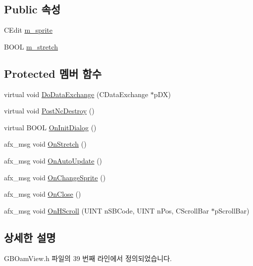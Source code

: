 \subsection*{Public 속성}
\begin{DoxyCompactItemize}
\item 
C\+Edit \mbox{\hyperlink{class_g_b_oam_view_a696d053b141cce3bf87fc4b85732159b}{m\+\_\+sprite}}
\item 
B\+O\+OL \mbox{\hyperlink{class_g_b_oam_view_a3148ea0439a7fc0679298adbdb5d2a3e}{m\+\_\+stretch}}
\end{DoxyCompactItemize}
\subsection*{Protected 멤버 함수}
\begin{DoxyCompactItemize}
\item 
virtual void \mbox{\hyperlink{class_g_b_oam_view_ab5683ad7b53ee6ac8208155503164506}{Do\+Data\+Exchange}} (C\+Data\+Exchange $\ast$p\+DX)
\item 
virtual void \mbox{\hyperlink{class_g_b_oam_view_ac9b79cd9099423b88668870db35a739a}{Post\+Nc\+Destroy}} ()
\item 
virtual B\+O\+OL \mbox{\hyperlink{class_g_b_oam_view_a633fdb700275a8a8ce96978472c643b5}{On\+Init\+Dialog}} ()
\item 
afx\+\_\+msg void \mbox{\hyperlink{class_g_b_oam_view_a580f292889a2fd21ab0bbf217d6abaa3}{On\+Stretch}} ()
\item 
afx\+\_\+msg void \mbox{\hyperlink{class_g_b_oam_view_a2c508aeb9089bfb1a21f88bd92c6753d}{On\+Auto\+Update}} ()
\item 
afx\+\_\+msg void \mbox{\hyperlink{class_g_b_oam_view_aabd5dcff93f2d91fbc979853123cd30f}{On\+Change\+Sprite}} ()
\item 
afx\+\_\+msg void \mbox{\hyperlink{class_g_b_oam_view_a09793b8c72f602f1e30b802552c13ee3}{On\+Close}} ()
\item 
afx\+\_\+msg void \mbox{\hyperlink{class_g_b_oam_view_a06667c6c7951c82b8a222b6663d2e999}{On\+H\+Scroll}} (U\+I\+NT n\+S\+B\+Code, U\+I\+NT n\+Pos, C\+Scroll\+Bar $\ast$p\+Scroll\+Bar)
\end{DoxyCompactItemize}


\subsection{상세한 설명}


G\+B\+Oam\+View.\+h 파일의 39 번째 라인에서 정의되었습니다.



